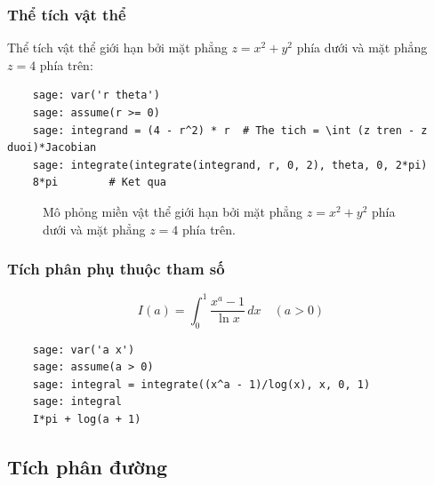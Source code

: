 \subsubsection{Thể tích vật thể}
Thể tích vật thể giới hạn bởi mặt phẳng \( z = x^2 + y^2 \) phía dưới và mặt phẳng \( z = 4 \) phía trên:
\begin{lstlisting}
	sage: var('r theta')
	sage: assume(r >= 0)
	sage: integrand = (4 - r^2) * r  # The tich = \int (z tren - z duoi)*Jacobian
	sage: integrate(integrate(integrand, r, 0, 2), theta, 0, 2*pi)
	8*pi 		# Ket qua 
\end{lstlisting}
\begin{figure}[ht!]
	\centering
	\caption{Mô phỏng miền vật thể giới hạn bởi mặt phẳng \( z = x^2 + y^2 \) phía dưới và mặt phẳng \( z = 4 \) phía trên.}
\end{figure}

\subsubsection{Tích phân phụ thuộc tham số}
\[ I(a) = \int_0^1 \frac{x^a - 1}{\ln x} \, dx \quad (a > 0) \]
\begin{lstlisting}
	sage: var('a x')
	sage: assume(a > 0)
	sage: integral = integrate((x^a - 1)/log(x), x, 0, 1)
	sage: integral
	I*pi + log(a + 1)
\end{lstlisting}

\subsection{Tích phân đường}
